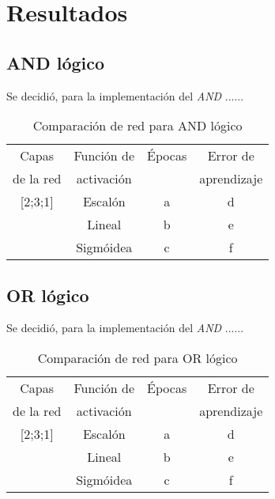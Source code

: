 \documentclass[%
    final,
    reprint,
    notitlepage,
    narroweqnarray,
    inline,
    twoside,
    invited
    ]{ieee}
\begin{document}
\section{Resultados}

\subsection{AND lógico}

\par Se decidió, para la implementación del \textit{AND} ......

\begin{table}[H]
\begin{center}
\begin{tabular}{|c|c|c|c|}
\hline
  Capas & Función de &  Épocas & Error de\\
 de la red & activación &  & aprendizaje\\

\hline
\hline

[2;3;1] & Escalón & a & d\\
\hline
[2;3;1] & Lineal & b & e\\
\hline
[2;3;1] & Sigmóidea & c & f\\
\hline

\end{tabular}
\end{center}
\caption{Comparación de red para AND lógico}\label{tablaIDFS}
\end{table}

\subsection{OR lógico}

\par Se decidió, para la implementación del \textit{AND} ......

\begin{table}[H]
\begin{center}
\begin{tabular}{|c|c|c|c|}
\hline
  Capas & Función de &  Épocas & Error de\\
 de la red & activación &  & aprendizaje\\

\hline
\hline

[2;3;1] & Escalón & a & d\\
\hline
[2;3;1] & Lineal & b & e\\
\hline
[2;3;1] & Sigmóidea & c & f\\
\hline

\end{tabular}
\end{center}
\caption{Comparación de red para OR lógico}\label{tablaIDFS}
\end{table}
\end{document}
